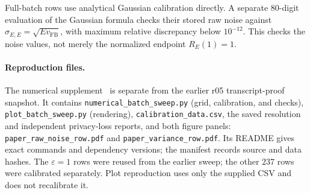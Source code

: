 \documentclass[11pt]{article}
\theoremstyle{remark}
\begin{document}
Full-batch rows use analytical Gaussian calibration directly. A separate
$80$-digit evaluation of the Gaussian formula checks their stored raw
noise against $\sigma_{E,E}=\sqrt{E v_{\mathrm{FB}}}$, with maximum
relative discrepancy below $10^{-12}$. This checks the noise values,
not merely the normalized endpoint $R_E(1)=1$.

\paragraph{Reproduction files.}
The numerical supplement~\cite{numerical-supplement} is separate from
the earlier r05 transcript-proof snapshot. It contains
\nolinkurl{numerical_batch_sweep.py} (grid, calibration, and checks),
\nolinkurl{plot_batch_sweep.py} (rendering),
\nolinkurl{calibration_data.csv}, the saved resolution and independent
privacy-loss reports, and both figure panels:
\nolinkurl{paper_raw_noise_row.pdf} and
\nolinkurl{paper_variance_row.pdf}.
Its README gives exact commands and dependency versions; the manifest
records source and data hashes. The $\varepsilon=1$ rows were reused from
the earlier sweep; the other $237$ rows were calibrated separately.
Plot reproduction uses only the supplied CSV and does not recalibrate it.
\end{document}
